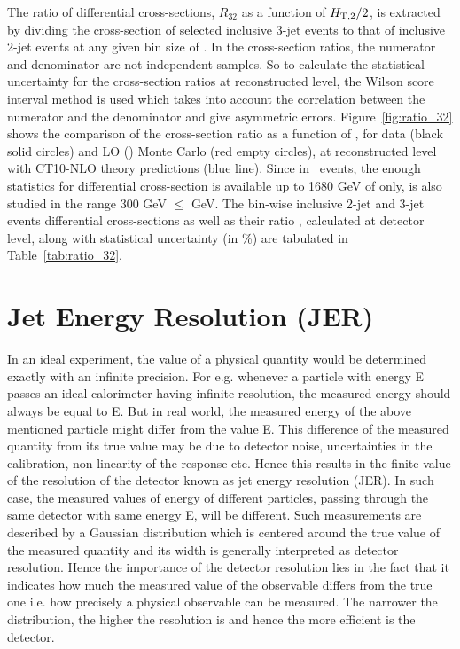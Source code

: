 The ratio of differential cross-sections, $R_{32}$ as a function of $H_{\mathrm{T,2}}/2$, is extracted by dividing the cross-section of selected inclusive 3-jet events to that of inclusive 2-jet events at any given bin size of \httwo. In the cross-section ratios, the numerator and denominator are not independent samples. So to calculate the statistical uncertainty for the cross-section ratios at reconstructed level, the Wilson score interval method is used which takes into account the correlation between the numerator and the denominator and give asymmetric errors. Figure~\ref{fig:ratio_32} shows the comparison of the cross-section ratio \ratio as a function of \httwons, for data (black solid circles) and LO \MadGraphFn\plusn \PYTHIAS (\MGP) Monte Carlo (red empty circles), at reconstructed level with CT10-NLO theory predictions (blue line). Since in \njth~events, the enough statistics for differential cross-section is available up to 1680 GeV of \httwo only, \ratio is also studied in the range 300 GeV $\leq$ \httwo {} GeV. The bin-wise inclusive 2-jet and 3-jet events differential cross-sections as well as their ratio \rations, calculated at detector level, along with statistical uncertainty (in \%) are tabulated in Table~\ref{tab:ratio_32}. 

\section{Jet Energy Resolution (JER)}
\label{sec:Resolution}
In an ideal experiment, the value of a physical quantity would be determined exactly with an infinite precision. For e.g. whenever a particle with energy E passes an ideal calorimeter having infinite resolution, the measured energy should always be equal to E. But in real world, the measured energy of the above mentioned particle might differ from the value E. This difference of the measured quantity from its true value may be due to detector noise, uncertainties in the calibration, non-linearity of the response etc. Hence this results in the finite value of the resolution of the detector known as jet energy resolution (JER). In such case, the measured values of energy of different particles, passing through the same detector with same energy E, will be different. Such measurements are described by a Gaussian distribution which is centered around the true value of the measured quantity and its width is generally interpreted as detector resolution. Hence the importance of the detector resolution lies in the fact that it indicates how much the measured value of the observable differs from the true one i.e. how precisely a physical observable can be measured. The narrower the distribution, the higher the resolution is and hence the more efficient is the detector. %

